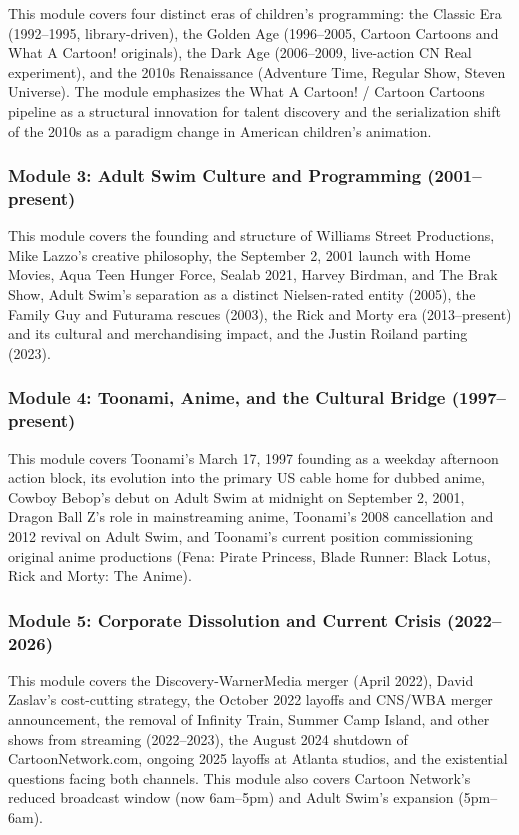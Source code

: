 \documentclass[11pt,letterpaper]{article}
\begin{document}
This module covers four distinct eras of children's programming: the Classic Era (1992--1995, library-driven), the Golden Age (1996--2005, Cartoon Cartoons and What A Cartoon! originals), the Dark Age (2006--2009, live-action CN Real experiment), and the 2010s Renaissance (Adventure Time, Regular Show, Steven Universe). The module emphasizes the What A Cartoon! / Cartoon Cartoons pipeline as a structural innovation for talent discovery and the serialization shift of the 2010s as a paradigm change in American children's animation.

\subsubsection{Module 3: Adult Swim Culture and Programming (2001--present)}

This module covers the founding and structure of Williams Street Productions, Mike Lazzo's creative philosophy, the September 2, 2001 launch with Home Movies, Aqua Teen Hunger Force, Sealab 2021, Harvey Birdman, and The Brak Show, Adult Swim's separation as a distinct Nielsen-rated entity (2005), the Family Guy and Futurama rescues (2003), the Rick and Morty era (2013--present) and its cultural and merchandising impact, and the Justin Roiland parting (2023).

\subsubsection{Module 4: Toonami, Anime, and the Cultural Bridge (1997--present)}

This module covers Toonami's March 17, 1997 founding as a weekday afternoon action block, its evolution into the primary US cable home for dubbed anime, Cowboy Bebop's debut on Adult Swim at midnight on September 2, 2001, Dragon Ball Z's role in mainstreaming anime, Toonami's 2008 cancellation and 2012 revival on Adult Swim, and Toonami's current position commissioning original anime productions (Fena: Pirate Princess, Blade Runner: Black Lotus, Rick and Morty: The Anime).

\subsubsection{Module 5: Corporate Dissolution and Current Crisis (2022--2026)}

This module covers the Discovery-WarnerMedia merger (April 2022), David Zaslav's cost-cutting strategy, the October 2022 layoffs and CNS/WBA merger announcement, the removal of Infinity Train, Summer Camp Island, and other shows from streaming (2022--2023), the August 2024 shutdown of CartoonNetwork.com, ongoing 2025 layoffs at Atlanta studios, and the existential questions facing both channels. This module also covers Cartoon Network's reduced broadcast window (now 6am--5pm) and Adult Swim's expansion (5pm--6am).
\end{document}
